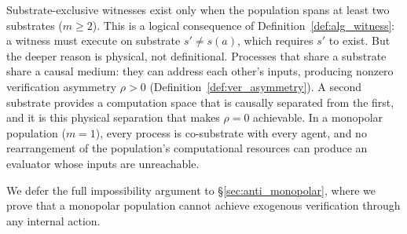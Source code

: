 Substrate-exclusive witnesses exist only when the population spans at
least two substrates ($m \geq 2$).  This is a logical consequence of
Definition~\ref{def:alg_witness}: a witness must execute on substrate
$s' \neq s(a)$, which requires $s'$ to exist.  But the deeper reason is
physical, not definitional.  Processes that share a substrate share a
causal medium: they can address each other's inputs, producing nonzero
verification asymmetry $\rho > 0$
(Definition~\ref{def:ver_asymmetry}).  A second substrate provides a
computation space that is causally separated from the first, and it
is this physical separation that makes $\rho = 0$ achievable.  In a
monopolar population ($m = 1$), every process is co-substrate with
every agent, and no rearrangement of the population's computational
resources can produce an evaluator whose inputs are unreachable.

We defer the full impossibility argument to
\S\ref{sec:anti_monopolar}, where we prove that a monopolar population
cannot achieve exogenous verification through any internal action.
